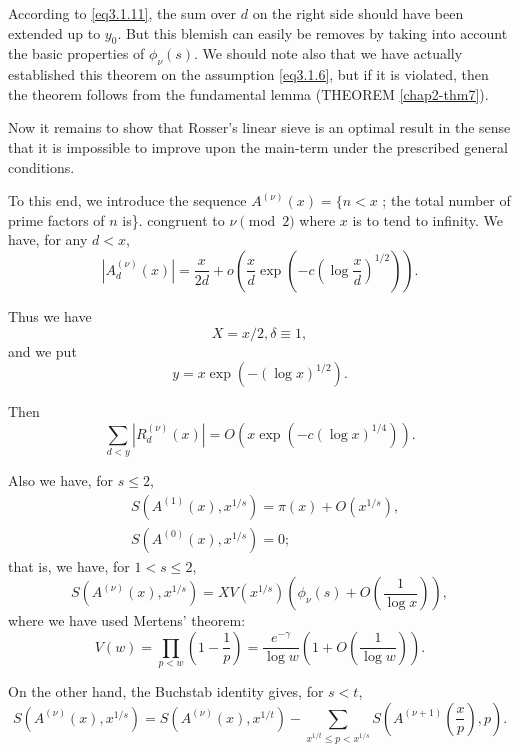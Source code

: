 \begin{remark*}%
  According to \eqref{eq3.1.11}, the sum over $d$ on the right side should
  have been extended up to $y_0$. But this blemish can easily be
  removes by taking into account the basic properties of
  $\phi_\nu(s)$. We should note also that we have actually established
  this theorem on the assumption \eqref{eq3.1.6}, but if it is violated, then
  the theorem follows from the fundamental lemma (THEOREM \ref{chap2-thm7}). 
\end{remark*}

Now it remains to show that Rosser's linear sieve is an optimal result
in the sense that it is impossible to improve upon the main-term under
the prescribed general conditions. 

To this end, we introduce the sequence  
$A^{(\nu)}(x)= \{ n < x$ ; the total number of prime factors of $n$
is\}. congruent to $\nu \pmod{2}$  
where $x$ is to tend to infinity. We have, for any $d < x$, 
$$
|A^{(\nu)}_{d}(x)| = \frac{x}{2d}+o\left(\frac{x}{d} \exp
\left(-c\left(\log \frac{x}{d}\right)^{1/2}\right)\right).
$$

Thus we have
$$
X = x/2, \delta \equiv 1,
$$\pageoriginale
and we put
$$  
y=x \exp\left(-(\log x)^{1/2}\right).
$$

Then
\begin{equation*}
  \sum_{d<y}|R^{(\nu)}_{d}(x)|=O\left(x \exp \left(-c(\log
  x)^{1/4}\right)\right). \tag{3.3.10} \label{eq3.3.10}
\end{equation*}

Also we have, for $s \le 2$,
\begin{align*}
  & S(A^{(1)}(x),x^{1/s}) = \pi (x) +O(x^{1/s}),\\
  & S(A^{(0)}(x),x^{1/s}) = 0;
\end{align*}
that is, we have, for $1 < s \le 2$,
\begin{equation*}
  S(A^{(\nu)}(x),x^{1/s}) = XV(x^{1/s})\left(\phi_\nu (s)+O\left(\frac{1}{\log
    x}\right)\right), \tag{3.3.11} \label{eq3.3.11}
\end{equation*}
where we have used Mertens' theorem:
$$
V(w) = \prod_{p < w}\left(1- \frac{1}{p}
\right)= \frac{e^{- \gamma}}{\log w}\left(1+O\left(\frac{1}{\log
  w}\right)\right).
$$

On the other hand, the Buchstab identity gives, for $s < t$,
$$
S(A^{(\nu)}(x),x^{1/s}) = S(A^{(\nu)}(x),x^{1/t}) - \sum_{x^{1/t}\le p
  < x^{1/s}}S\left(A^{(\nu +1)}\left(\frac{x}{p}\right),p\right). 
$$ 

